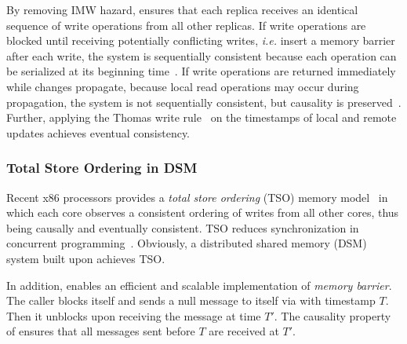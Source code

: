By removing IMW hazard, \sys ensures that each replica receives an identical sequence of write operations from all other replicas.
If write operations are blocked until receiving potentially conflicting writes, \textit{i.e.} insert a memory barrier after each write, the system is sequentially consistent because each operation can be serialized at its beginning time~\cite{lu2016snow}.
If write operations are returned immediately while changes propagate, because local read operations may occur during propagation, the system is not sequentially consistent, but causality is preserved~\cite{terry1995managing}.
Further, applying the Thomas write rule~\cite{thomas1979majority} on the timestamps of local and remote updates achieves eventual consistency.

\subsubsection{Total Store Ordering in DSM}

Recent x86 processors provides a \textit{total store ordering} (TSO) memory model~\cite{sewell2010x86} in which each core observes a consistent ordering of writes from all other cores, thus being causally and eventually consistent.
TSO reduces synchronization in concurrent programming~\cite{morrison2013fast,tassarotti2015verifying}.
Obviously, a distributed shared memory (DSM) system built upon \sys achieves TSO.

In addition, \sys enables an efficient and scalable implementation of \textit{memory barrier}.
The caller blocks itself and sends a null message to itself via \sys with timestamp $T$. Then it unblocks upon receiving the message at time $T'$.
The causality property of \sys ensures that all messages sent before $T$ are received at $T'$.

